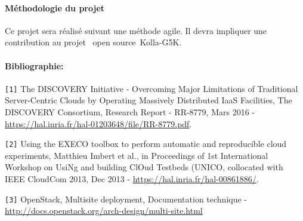 \documentclass[a4paper,11pt]{article}
\begin{document}
\begin{note}
\paragraph*{Méthodologie du projet\\}
Ce projet sera réalisé suivant une méthode agile. Il devra impliquer une
contribution au projet \og~open source~\fg Kolla-G5K.


\paragraph*{Bibliographie:\\}
%
\texttt{[1]} The DISCOVERY Initiative - Overcoming Major Limitations of Traditional Server-Centric Clouds by Operating Massively Distributed IaaS Facilities,  The DISCOVERY Consortium, Research Report - RR-8779, Mars 2016 - \url{https://hal.inria.fr/hal-01203648/file/RR-8779.pdf}.

\texttt{[2]} Using the EXECO toolbox to perform automatic and reproducible cloud experiments, Matthieu Imbert et al., in Proceedings of 1st International Workshop on UsiNg and building ClOud Testbeds (UNICO, collocated with IEEE CloudCom 2013, Dec 2013 - \url{https://hal.inria.fr/hal-00861886/}.

\texttt{[3]} OpenStack, Multisite deployment, Documentation technique - \url{http://docs.openstack.org/arch-design/multi-site.html}
\end{note}
\end{document}
